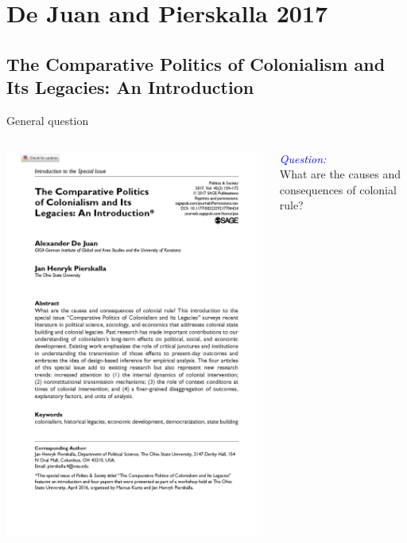 \documentclass[xcolor=dvipsnames]{beamer}
\begin{document}
	
	\section{De Juan and Pierskalla 2017}
	\subsection{The Comparative Politics of Colonialism and Its Legacies: An Introduction}
	
	\begin{frame}[fragile]{General question}
		\begin{columns}[T]
			\begin{column}{0.4\textwidth}
				\includegraphics[width=1\linewidth]{DeJuan2017cover.png}
			\end{column}
			
			\begin{column}{0.56\textwidth}
				\begin{center}
					\textit{\textcolor{blue}{Question:}}\\ \pause
					\bigskip		
					What are the causes and consequences of colonial rule?
				\end{center}
			\end{column}
		\end{columns}
	\end{frame}
	
\end{document}
